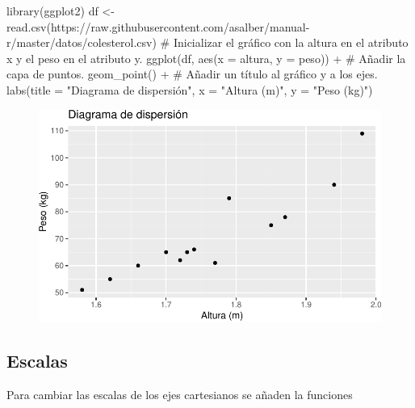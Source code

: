 \documentclass[
  a4paper,
]{scrreport}
\newenvironment{Shaded}{\begin{snugshade}}{\end{snugshade}}
\newcommand{\AttributeTok}[1]{\textcolor[rgb]{0.40,0.45,0.13}{#1}}
\newcommand{\CommentTok}[1]{\textcolor[rgb]{0.37,0.37,0.37}{#1}}
\newcommand{\FunctionTok}[1]{\textcolor[rgb]{0.28,0.35,0.67}{#1}}
\newcommand{\NormalTok}[1]{\textcolor[rgb]{0.00,0.23,0.31}{#1}}
\newcommand{\OtherTok}[1]{\textcolor[rgb]{0.00,0.23,0.31}{#1}}
\newcommand{\SpecialCharTok}[1]{\textcolor[rgb]{0.37,0.37,0.37}{#1}}
\newcommand{\StringTok}[1]{\textcolor[rgb]{0.13,0.47,0.30}{#1}}
\theoremstyle{definition}
\theoremstyle{definition}
\theoremstyle{remark}
\begin{document}
\begin{Shaded}
\begin{Highlighting}[]
\FunctionTok{library}\NormalTok{(ggplot2)}
\NormalTok{df }\OtherTok{\textless{}{-}} \FunctionTok{read.csv}\NormalTok{(}\StringTok{\textquotesingle{}https://raw.githubusercontent.com/asalber/manual{-}r/master/datos/colesterol.csv\textquotesingle{}}\NormalTok{)}
\CommentTok{\# Inicializar el gráfico con la altura en el atributo x y el peso en el atributo y.}
\FunctionTok{ggplot}\NormalTok{(df, }\FunctionTok{aes}\NormalTok{(}\AttributeTok{x =}\NormalTok{ altura, }\AttributeTok{y =}\NormalTok{ peso)) }\SpecialCharTok{+}
\CommentTok{\# Añadir la capa de puntos.}
    \FunctionTok{geom\_point}\NormalTok{() }\SpecialCharTok{+}
\CommentTok{\# Añadir un título al gráfico y a los ejes.}
    \FunctionTok{labs}\NormalTok{(}\AttributeTok{title =} \StringTok{"Diagrama de dispersión"}\NormalTok{, }\AttributeTok{x =} \StringTok{"Altura (m)"}\NormalTok{, }\AttributeTok{y =} \StringTok{"Peso (kg)"}\NormalTok{)}
\end{Highlighting}
\end{Shaded}

\begin{figure}[H]

{\centering \includegraphics{07-graficos_files/figure-pdf/unnamed-chunk-28-1.pdf}

}

\end{figure}

\hypertarget{escalas}{%
\subsection{Escalas}\label{escalas}}

Para cambiar las escalas de los ejes cartesianos se añaden la funciones
\end{document}
